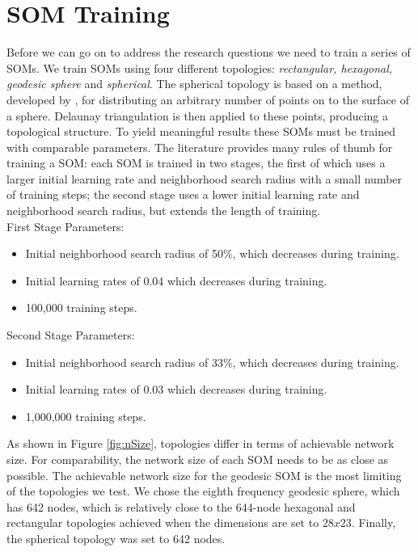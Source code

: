 \section{SOM Training}
\label{meth:train}
Before we can go on to address the research questions we need to train a
series of SOMs.  We train SOMs using four different topologies:
\emph{rectangular, hexagonal, geodesic sphere} and \emph{spherical}.  The spherical
topology is based on a method, developed by \cite{Rakhmanov94}, for
distributing an arbitrary number of points on to the surface of a sphere.
Delaunay triangulation is then applied to these points, producing a
topological structure.  To yield meaningful results these SOMs must be trained
with comparable parameters.  The literature provides many rules of thumb for
training a SOM: each SOM is trained in two stages, the first of which uses a larger
initial learning rate and neighborhood search radius with a small number of
training steps; the second stage uses a lower initial learning rate and
neighborhood search radius, but extends the length of training.
\\
First Stage Parameters:
\begin{itemize}
  \item Initial neighborhood search radius of 50\%, which decreases during training. 
  \item Initial learning rates of 0.04 which decreases during training.
  \item 100,000 training steps.
\end{itemize}
Second Stage Parameters:
\begin{itemize}
  \item Initial neighborhood search radius of 33\%, which decreases during training. 
  \item Initial learning rates of 0.03 which decreases during training.
  \item 1,000,000 training steps.
\end{itemize}

As shown in Figure \ref{fig:nSize}, topologies differ in terms of achievable
network size.  For comparability, the network size of each SOM needs to be as
close as possible.  The achievable network size for the geodesic SOM is the
most limiting of the topologies we test. We chose the eighth frequency
geodesic sphere, which has 642 nodes, which is relatively close to the
644-node hexagonal and rectangular topologies achieved when the dimensions are
set to \(28x23\). Finally, the spherical topology was set to 642 nodes.


